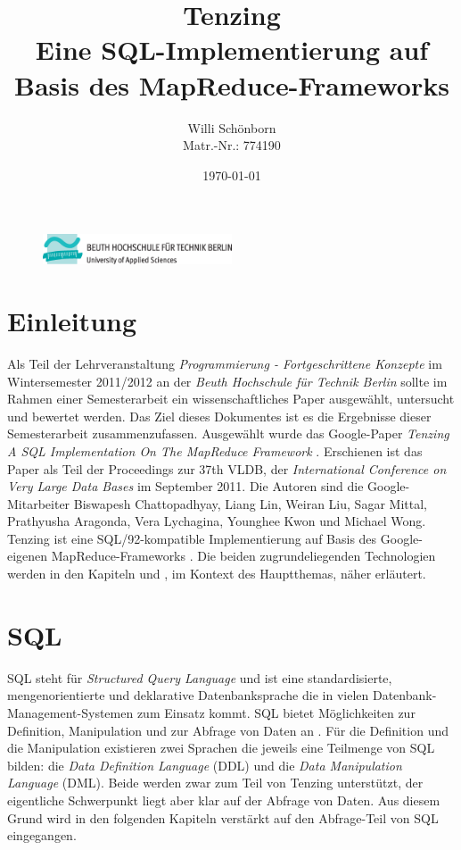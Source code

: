 \documentclass[a4paper]{article}
\title{Tenzing \\ Eine SQL-Implementierung auf Basis des MapReduce-Frameworks}
\author{Willi Schönborn \\  Matr.-Nr.: 774190}
\date{\today}
\begin{document}
\begin{figure}[H]
\centering
\includegraphics[width=0.5\textwidth]{beuth.eps}
\maketitle
\end{figure}

\newpage

\tableofcontents

\newpage

\section{Einleitung}
Als Teil der Lehrveranstaltung \textit{Programmierung - Fortgeschrittene Konzepte} im Wintersemester 2011/2012 an der \textit{Beuth Hochschule für Technik Berlin} sollte im Rahmen einer Semesterarbeit ein wissenschaftliches Paper ausgewählt, untersucht und bewertet werden. Das Ziel dieses Dokumentes ist es die Ergebnisse dieser Semesterarbeit zusammenzufassen. Ausgewählt wurde das Google-Paper \textit{Tenzing A SQL Implementation On The MapReduce Framework} \cite{TENZING}. Erschienen ist das Paper als Teil der Proceedings zur 37th VLDB, der \textit{International Conference on Very Large Data Bases} im September 2011. Die Autoren sind die Google-Mitarbeiter Biswapesh Chattopadhyay, Liang Lin, Weiran Liu, Sagar Mittal, Prathyusha Aragonda, Vera Lychagina, Younghee Kwon und Michael Wong. Tenzing ist eine SQL/92-kompatible Implementierung auf Basis des Google-eigenen MapReduce-Frameworks \cite{MAPREDUCE}. Die beiden zugrundeliegenden Technologien werden in den Kapiteln  und , im Kontext des Hauptthemas, näher erläutert.

\newpage

\section{SQL}
\label{sql}
SQL steht für \textit{Structured Query Language} und ist eine standardisierte, mengenorientierte und deklarative Datenbanksprache die in vielen Datenbank-Management-Systemen zum Einsatz kommt. SQL bietet Möglichkeiten zur Definition, Manipulation und zur Abfrage von Daten an \cite{Codd}. Für die Definition und die Manipulation existieren zwei Sprachen die jeweils eine Teilmenge von SQL bilden: die \textit{Data Definition Language} (DDL) und die \textit{Data Manipulation Language} (DML). Beide werden zwar zum Teil von Tenzing unterstützt, der eigentliche Schwerpunkt liegt aber klar auf der Abfrage von Daten. Aus diesem Grund wird in den folgenden Kapiteln verstärkt auf den Abfrage-Teil von SQL eingegangen.
\end{document}
